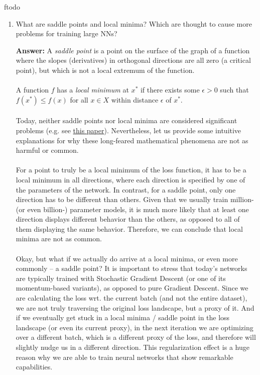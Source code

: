 ƒtodo\documentclass{article}
\newenvironment{QandA}{\begin{enumerate}[label=\arabic*.]}{\end{enumerate}}
\newenvironment{answer}{\par\normalfont \textbf{Answer:}}{}
\begin{document}
\begin{QandA}
    \item What are saddle points and local minima? Which are thought to cause more problems for training large NNs?
    \begin{answer}
        A \textit{saddle point} is a point on the surface of the graph of a function where the slopes (derivatives) in orthogonal directions are all zero (a critical point), but which is not a local extremum of the function. \\\\
        A function $f$ has a \textit{local minimum} at $x^*$ if there exists some $\epsilon > 0$ such that $f(x^*) \le f(x)$ for all $x \in X$ within distance $\epsilon$ of $x^*$. \\\\
        Today, neither saddle points nor local minima are considered significant problems (e.g. see \href{https://arxiv.org/abs/1412.6544}{this paper}). Nevertheless, let us provide some intuitive explanations for why these long-feared mathematical phenomena are not as harmful or common.\\\\
        For a point to truly be a local minimum of the loss function, it has to be a local minimum in all directions, where each direction is specified by one of the parameters of the network. In contrast, for a saddle point, only one direction has to be different than others. Given that we usually train million- (or even billion-) parameter models, it is much more likely that at least one direction displays different behavior than the others, as opposed to all of them displaying the same behavior. Therefore, we can conclude that local minima are not as common. \\\\
        Okay, but what if we actually do arrive at a local minima, or even more commonly -- a saddle point? It is important to stress that today's networks are typically trained with Stochastic Gradient Descent (or one of its momentum-based variants), as opposed to pure Gradient Descent. Since we are calculating the loss wrt. the current batch (and not the entire dataset), we are not truly traversing the original loss landscape, but a proxy of it. And if we eventually get stuck in a local minima / saddle point in the loss landscape (or even its current proxy), in the next iteration we are optimizing over a different batch, which is a different proxy of the loss, and therefore will slightly nudge us in a different direction. This regularization effect is a huge reason why we are able to train neural networks that show remarkable capabilities. 


\end{answer}
\end{QandA}
\end{document}
